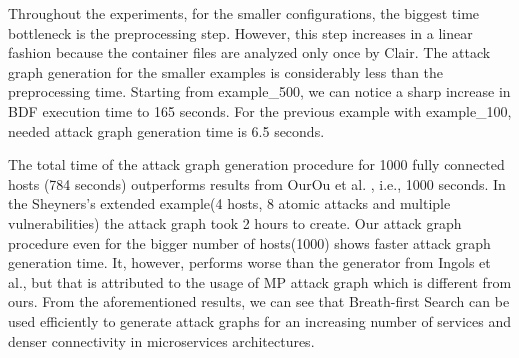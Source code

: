 Throughout the experiments, for the smaller configurations, the biggest time bottleneck is the preprocessing step. However, this step increases in a linear fashion because the container files are analyzed only once by Clair. The attack graph generation for the smaller examples is considerably less than the preprocessing time. Starting from example\_500, we can notice a sharp increase in BDF execution time to 165 seconds. For the previous example with example\_100, needed attack graph generation time is 6.5 seconds.

The total time of the attack graph generation procedure for 1000 fully connected hosts (784 seconds) outperforms results from OurOu et al. \cite{ou2006scalable}, i.e., 1000 seconds. In the Sheyners's extended example(4 hosts, 8 atomic attacks and multiple vulnerabilities) the attack graph took 2 hours to create. Our attack graph procedure even for the bigger number of hosts(1000) shows faster attack graph generation time. It, however, performs worse than the generator from Ingols et al., but that is attributed to the usage of MP attack graph which is different from ours. From the aforementioned results, we can see that Breath-first Search can be used efficiently to generate attack graphs for an increasing number of services and denser connectivity in microservices architectures. 
